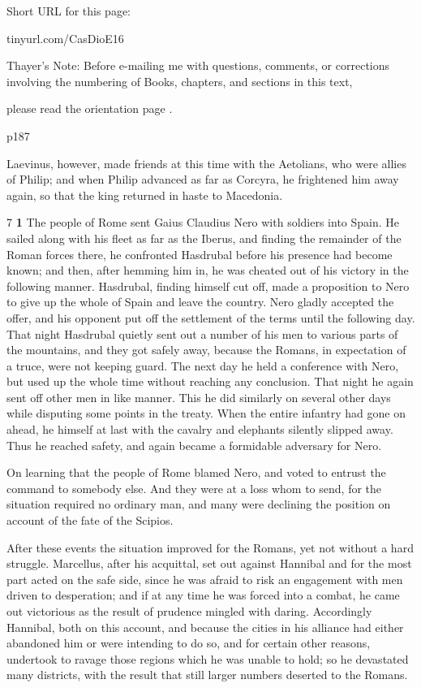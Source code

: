 
Short URL for this page:

tinyurl.com/CasDioE16

Thayer's Note: Before e-mailing me with questions, comments, or corrections involving the numbering of Books, chapters, and sections in this text,

please read the orientation page .

p187

Laevinus, however, made friends at this time with the Aetolians, who were allies of Philip; and when Philip advanced as far as Corcyra, he frightened him away again, so that the king returned in haste to Macedonia.

7 \textbf{1} The people of Rome sent Gaius Claudius Nero with soldiers into Spain. He sailed along with his fleet as far as the Iberus, and finding the remainder of the Roman forces there, he confronted Hasdrubal before his presence had become known; and then, after hemming him in, he was cheated out of his victory in the following manner. Hasdrubal, finding himself cut off, made a proposition to Nero to give up the whole of Spain and leave the country. Nero gladly accepted the offer, and his opponent put off the settlement of the terms until the following day. That night Hasdrubal quietly sent out a number of his men to various parts of the mountains, and they got safely away, because the Romans, in expectation of a truce, were not keeping guard. The next day he held a conference with Nero, but used up the whole time without reaching any conclusion. That night he again sent off other men in like manner. This he did similarly on several other days while disputing some points in the treaty. When the entire infantry had gone on ahead, he himself at last with the cavalry and elephants silently slipped away. Thus he reached safety, and again became a formidable adversary for Nero.

On learning that the people of Rome blamed Nero, and voted to entrust the command to somebody else. And they were at a loss whom to send, for the situation required no ordinary man, and many were declining the position on account of the fate of the Scipios.

After these events the situation improved for the Romans, yet not without a hard struggle. Marcellus, after his acquittal, set out against Hannibal and for the most part acted on the safe side, since he was afraid to risk an engagement with men driven to desperation; and if at any time he was forced into a combat, he came out victorious as the result of prudence mingled with daring. Accordingly Hannibal, both on this account, and because the cities in his alliance had either abandoned him or were intending to do so, and for certain other reasons, undertook to ravage those regions which he was unable to hold; so he devastated many districts, with the result that still larger numbers deserted to the Romans.

